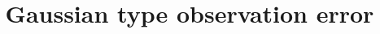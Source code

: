 \documentclass[12pt]{article}%
\theoremstyle{thmstyleone}%
\theoremstyle{thmstyletwo}%
\theoremstyle{thmstylethree}%
\begin{document}
\title{Gaussian type observation error}




% 
% 
% 
\end{document}
